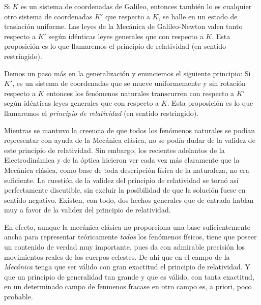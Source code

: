 \documentclass[spanish]{book}
\begin{document}
Si $K$ es un sistema de coordenadas de Galileo, entonces también lo es cualquier otro
sistema de coordenadas $K'$ que respecto a $K$, se halle en un estado de traslación
uniforme. Las leyes de la Mecánica de Galileo-Newton valen tanto respecto a
$K'$ según idénticas leyes generales que con respecto a $K$. Esta proposición es lo
que llamaremos el principio de relatividad (en sentido restringido).

Demos un paso más en la generalización y enunciemos el siguiente principio: Si $K'$,
es un sistema de coordenadas que se mueve uniformemente y sin rotación respecto a $K$
entonces los fenómenos naturales transcurren con respecto a $K'$ según idénticas leyes
generales que con respecto a $K$. Esta proposición es lo que llamaremos el \emph{principio de
relatividad} (en sentido restringido).

Mientras se mantuvo la creencia de que todos los fenómenos naturales se podían
representar con ayuda de la Mecánica clásica, no se podía dudar de la validez de este
principio de relatividad. Sin embargo, los recientes adelantos de la Electrodinámica y
de la óptica hicieron ver cada vez más claramente que la Mecánica clásica, como base
de toda descripción física de la naturaleza, no era suficiente. La cuestión de la validez
del principio de relatividad se tornó así perfectamente discutible, sin excluir la
posibilidad de que la solución fuese en sentido negativo. Existen, con todo, dos
hechos generales que de entrada hablan muy a favor de la validez del principio de
relatividad. 

En efecto, aunque la mecánica clásica no proporciona una base
suficientemente ancha para representar teóricamente \textit{todos} los fenómenos físicos,
tiene que poseer un contenido de verdad muy importante, pues da con admirable
precisión los movimientos reales de los cuerpos celestes. De ahí que en el campo de la
\textit{Mecánica} tenga que ser válido con gran exactitud el principio de relatividad. Y que un
principio de generalidad tan grande y que es válido, con tanta exactitud, en un
determinado campo de fenmenos fracase en otro campo es, a priori, poco
probable.
\end{document}
